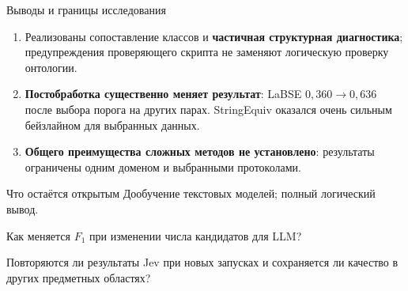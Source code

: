 \documentclass[aspectratio=169,11pt]{beamer}
\begin{document}
\renewcommand{\hseheadertext}{Сопоставление таксономий}
\begin{frame}{Выводы и границы исследования}
  \begin{enumerate}
    \item Реализованы сопоставление классов и \textbf{частичная структурная диагностика};
      предупреждения проверяющего скрипта не заменяют логическую проверку онтологии.
    \item \textbf{Постобработка существенно меняет результат}:
      LaBSE $0{,}360 \to 0{,}636$ после выбора порога на других парах.
      StringEquiv оказался очень сильным бейзлайном для выбранных данных.
    \item \textbf{Общего преимущества сложных методов не установлено}:
      результаты ограничены одним доменом и выбранными протоколами.
  \end{enumerate}
  \begin{block}{Что остаётся открытым}
    Дообучение текстовых моделей; полный логический вывод.\par
    Как меняется $F_1$ при изменении числа кандидатов для LLM?\par
    Повторяются ли результаты Jev при новых запусках и сохраняется ли качество
    в других предметных областях?
  \end{block}
\end{frame}

\renewcommand{\hseheadertext}{Сопоставление таксономий}
\begin{frame}[plain]
\end{frame}

\begin{frame}[plain]
\end{frame}
\end{document}
